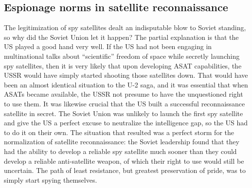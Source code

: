 \documentclass[14pt]{extarticle}
\begin{document}
\subsection{Espionage norms in satellite reconnaissance}
The legitimization of spy satellites dealt an indisputable blow to Soviet standing, so why did the Soviet Union let it happen? The partial explanation is that the US played a good hand very well. If the US had not been engaging in multinational talks about \enquote{scientific} freedom of space while secretly launching spy satellites, then it is very likely that upon developing ASAT capabilities, the USSR would have simply started shooting those satellites down. That would have been an almost identical situation to the U-2 saga, and it was essential that when ASATs became available, the USSR not presume to have the unquestioned right to use them. It was likewise crucial that the US built a successful reconnaissance satellite in secret. The Soviet Union was unlikely to launch the first spy satellite and give the US a perfect excuse to neutralize the intelligence gap, so the US had to do it on their own. The situation that resulted was a perfect storm for the normalization of satellite reconnaissance: the Soviet leadership found that they had the ability to develop a reliable spy satellite much sooner than they could develop a reliable anti-satellite weapon, of which their right to use would still be uncertain. The path of least resistance, but greatest preservation of pride, was to simply start spying themselves.

\end{document}
